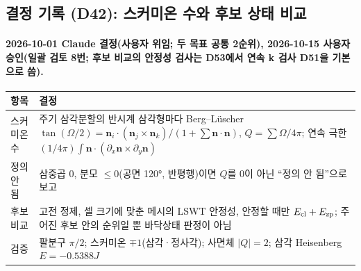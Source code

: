\subsection{결정 기록 (D42): 스커미온 수와 후보 상태 비교}\label{decisions-d42-texture}
\begingroup%
  \framesubtitle{2026-10-01 Claude 결정(사용자 위임; 두 목표 공통 2순위), 2026-10-15 사용자 승인(일괄 검토 8번; 후보 비교의 안정성 검사는 D53에서 연속 k 검사 D51을 기본으로 씀).}
  \small\renewcommand{\arraystretch}{1.12}
  \begin{tabularx}{\textwidth}{@{}P{3.0cm}Y@{}}
    \toprule
    항목 & 결정 \\
    \midrule
    스커미온 수 & 주기 삼각분할의 반시계 삼각형마다 Berg--L\"uscher $\tan(\Omega/2)=\mathbf n_i\cdot(\mathbf n_j\times\mathbf n_k)/(1+\sum\mathbf n\cdot\mathbf n)$, $Q=\sum\Omega/4\pi$; 연속 극한 $(1/4\pi)\int\mathbf n\cdot(\partial_x\mathbf n\times\partial_y\mathbf n)$ \\
    정의 안 됨 & 삼중곱 0, 분모 $\le 0$(공면 120°, 반평행)이면 $Q$를 0이 아닌 ``정의 안 됨''으로 보고 \\
    후보 비교 & 고전 정제, 셀 크기에 맞춘 메시의 LSWT 안정성, 안정할 때만 $E_{\rm cl}+E_{\rm zp}$; 주어진 후보 안의 순위일 뿐 바닥상태 판정이 아님 \\
    검증 & 팔분구 $\pi/2$; 스커미온 $\mp1$(삼각·정사각); 사면체 $|Q|=2$; 삼각 Heisenberg $E=-0.5388J$ \\
    \bottomrule
  \end{tabularx}
\endgroup


